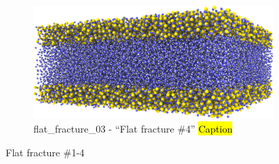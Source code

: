 \begin{figure}[htpb]
\begin{subfigure}[b]{\myfigwidth}
{        }%
        \label{fig:renderings_flat_fracture02}%
    \end{subfigure}%
    \hfill%
    \begin{subfigure}[b]{\myfigwidth}%
        \centering%
        \includegraphics[width=\textwidth]{images/systems/trimmed-flat_fracture03_03}%
        \caption{%
            flat\_fracture\_03 - ``Flat fracture \#4'' \hl{Caption} %
        }%
        \label{fig:renderings_flat_fracture03}%
    \end{subfigure}%
    \caption{%
        Flat fracture \#1-4
        \label{fig:renderings_flat_fractures}%
    }%
\end{figure}%
%